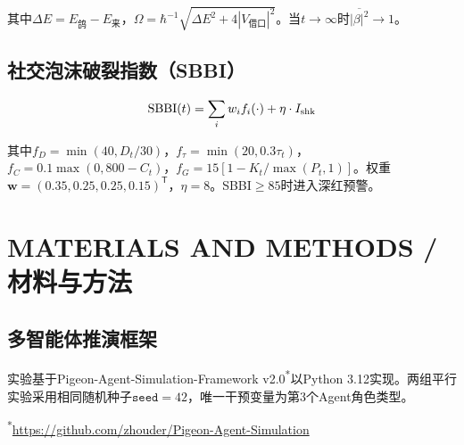 \documentclass[journal]{IEEEtran}
\begin{document}
其中$\Delta E = E_{\text{鸽}} - E_{\text{来}}$，$\Omega = \hbar^{-1}\sqrt{\Delta E^2 + 4|V_{\text{借口}}|^2}$。当$t \to \infty$时$\overline{|\beta|^2} \to 1$。

\subsection{社交泡沫破裂指数（SBBI）}

\begin{equation}
\begin{aligned}
\label{eq:bbbi}
\text{SBBI}(t) = \sum_i w_i f_i(\cdot) + \eta \cdot I_{\rm shk}
\end{aligned}
\end{equation}

其中$f_D=\min(40, D_t/30)$，$f_\tau=\min(20, 0.3\tau_t)$，$f_C=0.1\max(0, 800-C_t)$，$f_G=15[1-K_t/\max(P_t,1)]$。权重$\bm{w}=(0.35,0.25,0.25,0.15)^{\mathsf{T}}$，$\eta=8$。SBBI$\ge 85$时进入深红预警。

\section{MATERIALS AND METHODS / 材料与方法}

\subsection{多智能体推演框架}

实验基于Pigeon-Agent-Simulation-Framework v2.0\textsuperscript{*}以Python 3.12实现。两组平行实验采用相同随机种子$\texttt{seed}=42$，唯一干预变量为第3个Agent角色类型。

\vspace{0.05cm}\noindent\small\textsuperscript{*}{\url{https://github.com/zhouder/Pigeon-Agent-Simulation}}\normalsize

\begin{table}[ht]
\begin{center}
\caption{Agent行为参数向量$\bm{\theta}_i$配置。}
\label{tab:params}
\small
{}
\end{center}
\end{table}
\normalsize
\end{document}
